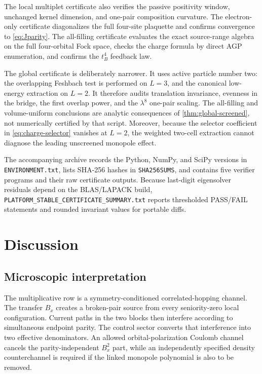 \documentclass[11pt]{article}
\theoremstyle{definition}
\theoremstyle{remark}
\begin{document}
The local multiplet certificate also verifies the passive positivity window, unchanged kernel dimension, and one-pair composition curvature.  The electron-only certificate diagonalizes the full four-site plaquette and confirms convergence to \eqref{eq:Jparity}.  The all-filling certificate evaluates the exact source-range algebra on the full four-orbital Fock space, checks the charge formula by direct AGP enumeration, and confirms the $t_B^4$ feedback law.

The global certificate is deliberately narrower.  It uses active particle number two: the overlapping Feshbach test is performed on $L=3$, and the canonical low-energy extraction on $L=2$.  It therefore audits translation invariance, evenness in the bridge, the first overlap power, and the $\lambda^8$ one-pair scaling.  The all-filling and volume-uniform conclusions are analytic consequences of \cref{thm:global-screened}, not numerically certified by that script.  Moreover, because the selector coefficient in \eqref{eq:charge-selector} vanishes at $L=2$, the weighted two-cell extraction cannot diagnose the leading unscreened monopole effect.

The accompanying archive records the Python, NumPy, and SciPy versions in \texttt{ENVIRONMENT.txt}, lists SHA-256 hashes in \texttt{SHA256SUMS}, and contains five verifier programs and their raw certificate outputs.  Because last-digit eigensolver residuals depend on the BLAS/LAPACK build, \texttt{PLATFORM\_STABLE\_CERTIFICATE\_SUMMARY.txt} reports thresholded PASS/FAIL statements and rounded invariant values for portable diffs.
\section{Discussion}
\label{sec:discussion}

\subsection{Microscopic interpretation}

The multiplicative row is a symmetry-conditioned correlated-hopping channel.  The transfer $B_x$ creates a broken-pair source from every seniority-zero local configuration.  Current paths in the two blocks then interfere according to simultaneous endpoint parity.  The control sector converts that interference into two effective denominators.  An allowed orbital-polarization Coulomb channel cancels the parity-independent $B_x^2$ part, while an independently specified density counterchannel is required if the linked monopole polynomial is also to be removed.
\end{document}
